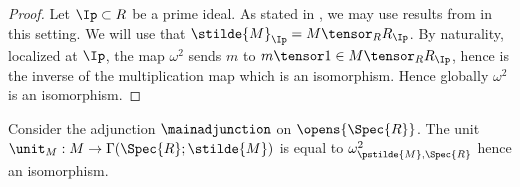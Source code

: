 
\begin{proof}
Let $\Ip \subset R$ be a prime ideal.
As stated in , we may use results from \cite[Tag 01BH]{stacks} in this setting.
We will use that $\stilde{M}_{\Ip} = M \tensor_R R_{\Ip}$.
By naturality, localized at $\Ip$,
the map $\omega^2$ sends $m$ to $m\tensor 1 \in M \tensor_R R_{\Ip}$,
hence is the inverse of the multiplication map which is an isomorphism.
Hence globally $\omega^2$ is an isomorphism.
\end{proof}


\begin{corollary}
Consider the adjunction $\mainadjunction$ on $\opens{\Spec{R}}$.
The unit $\unit_M:M \rightarrow \Gamma(\Spec{R};\stilde{M})$ is 
equal to $\omega^2_{\pstilde{M},\Spec{R}}$ hence an isomorphism.
\end{corollary}
